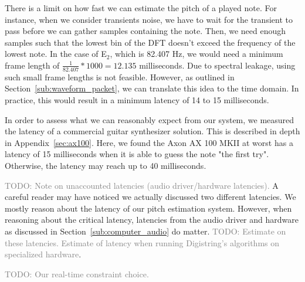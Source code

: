 \documentclass[10pt,twocolumn]{article}
\newcommand{\note}[2]{#1${}_{#2}$}
\begin{document}
There is a limit on how fast we can estimate the pitch of a played note. For instance, when we consider transients noise, we have to wait for the transient to pass before we can gather samples containing the note. Then, we need enough samples such that the lowest bin of the DFT doesn't exceed the frequency of the lowest note. In the case of \note{E}{2}, which is 82.407 Hz, we would need a minimum frame length of $ \frac{1}{82.407} * 1000 = 12.135 $ milliseconds. Due to spectral leakage, using such small frame lengths is not feasible. However, as outlined in Section~\ref{sub:waveform_packet}, we can translate this idea to the time domain. In practice, this would result in a minimum latency of 14 to 15 milliseconds.

In order to assess what we can reasonably expect from our system, we measured the latency of a commercial guitar synthesizer solution. This is described in depth in Appendix~\ref{sec:ax100}. Here, we found the Axon AX 100 MKII at worst has a latency of 15 milliseconds when it is able to guess the note "the first try". Otherwise, the latency may reach up to 40 milliseconds.

\textcolor{gray}{TODO: Note on unaccounted latencies (audio driver/hardware latencies).}
A careful reader may have noticed we actually discussed two different latencies. We mostly reason about the latency of our pitch estimation system. However, when reasoning about the critical latency, latencies from the audio driver and hardware as discussed in Section~\ref{sub:computer_audio} do matter. \textcolor{gray}{TODO: Estimate on these latencies. Estimate of latency when running Digistring's algorithms on specialized hardware}.

\textcolor{gray}{TODO: Our real-time constraint choice.}


\end{document}
